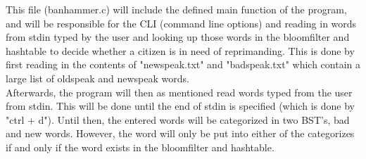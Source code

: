\documentclass[
	12pt, %
]{fphw}
\begin{document}
This file (banhammer.c) will include the defined main function of the program, and will be responsible for the CLI (command line options) and reading in words from stdin typed by the user and looking up those words in the bloomfilter and hashtable to decide whether a citizen is in need of reprimanding. This is done by first reading in the contents of "newspeak.txt" and "badspeak.txt" which contain a large list of oldspeak and newspeak words. \\
Afterwards, the program will then as mentioned read words typed from the user from stdin. This will be done until the end of stdin is specified (which is done by "ctrl + d"). Until then, the entered words will be categorized in two BST's, bad and new words. However, the word will only be put into either of the categorizes if and only if the word exists in the bloomfilter and hashtable.
\end{document}
